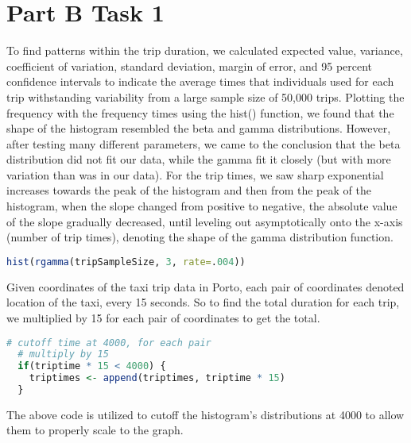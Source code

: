 \documentclass{article}
\begin{document}
\section{Part B Task 1}
\indent To find patterns within the trip duration, we calculated expected value, variance, coefficient of variation, standard deviation, margin of error, and 95 percent confidence intervals to indicate the average times that individuals used for each trip withstanding variability from a large sample size of 50,000 trips. Plotting the frequency with the frequency times using the hist() function, we found that the shape of the histogram resembled the beta and gamma distributions. However, after testing many different parameters, we came to the conclusion that the beta distribution did not fit our data, while the gamma fit it closely (but with more variation than was in our data). For the trip times, we saw sharp exponential increases towards the peak of the histogram and then from the peak of the histogram, when the slope changed from positive to negative, the absolute value of the slope gradually decreased, until leveling out asymptotically onto the x-axis (number of trip times), denoting the shape of the gamma distribution function.\\
\begin{lstlisting}[language=R]
hist(rgamma(tripSampleSize, 3, rate=.004))
\end{lstlisting}

\indent Given coordinates of the taxi trip data in Porto, each pair of coordinates denoted location of the taxi, every 15 seconds. So to find the total duration for each trip, we multiplied by 15 for each pair of coordinates to get the total. 
\begin{lstlisting}[language=R]
# cutoff time at 4000, for each pair
  # multiply by 15
  if(triptime * 15 < 4000) {
    triptimes <- append(triptimes, triptime * 15)
  }
\end{lstlisting}



\indent The above code is utilized to cutoff the histogram's distributions at 4000 to allow them to properly scale to the graph.



\end{document}
